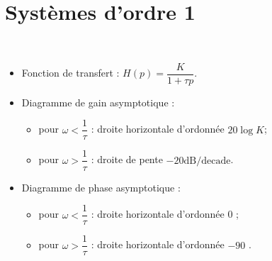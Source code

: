 \documentclass[10pt,fleqn]{article} %
\begin{document}
\section{Systèmes d'ordre 1}
\begin{resultat} ~\\

\vspace{-.5cm}

\noindent\begin{minipage}[c]{.53\linewidth}
\begin{itemize}
\item Fonction de transfert : $H(p)=\dfrac{K}{1+\tau p}$.
\item Diagramme de gain asymptotique : 
\begin{itemize}
\item pour $\omega<\dfrac{1}{\tau}$ : droite horizontale d'ordonnée $20 \log K$;
\item pour $\omega>\dfrac{1}{\tau}$ : droite de pente $-{20}\text{dB/decade}$.
\end{itemize}
\item Diagramme de phase asymptotique : 
\begin{itemize}
\item pour $\omega<\dfrac{1}{\tau}$ : droite horizontale d'ordonnée 0 \degre;
\item pour $\omega>\dfrac{1}{\tau}$ : droite horizontale d'ordonnée $-90$ \degre.
\end{itemize}
\end{itemize}
\end{minipage} \hfill
\begin{minipage}[c]{.45\linewidth}


\end{minipage}
\end{resultat}
\end{document}
